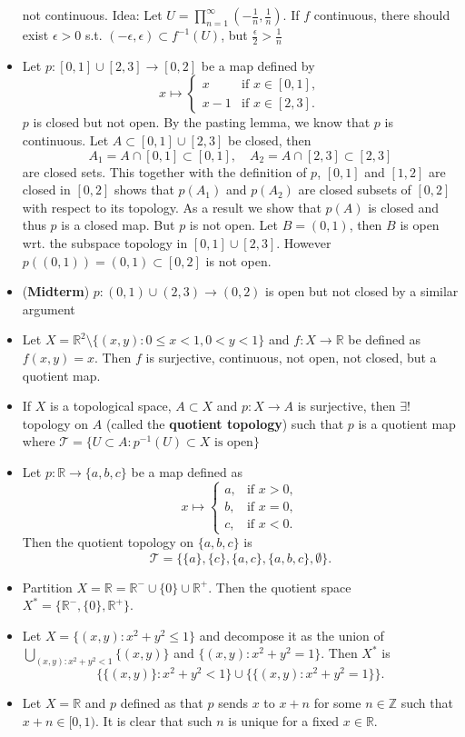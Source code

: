\documentclass[frenchspacing,9pt,landscape,a4paper]{article}
\newcommand{\BR}{\mathbb R}
\theoremstyle{remark}
\begin{document}
\begin{multicols}{4}
\begin{itemize}
        not continuous. Idea: Let  $U=\prod_{n=1}^\infty(-\frac{1}{n},\frac{1}{n})$. If $f$ continuous,
        there should exist  $\epsilon>0$ s.t.  $(-\epsilon,\epsilon)\subset f^{-1}(U)$, but
        $\frac{\epsilon}{2}>\frac{1}{n}$
    \item Let $p : [0,1] \cup [2,3] \to [0,2]$ be a map defined by
\[ x \mapsto \begin{cases}
x & \text{if } x \in [0,1], \\
x-1 & \text{if } x \in [2,3].
\end{cases} \]
$p$ is closed but not open. By the pasting lemma, we know that $p$ is continuous. Let $A \subset [0,1] \cup [2,3]$ be closed, then
\[ A_1 = A \cap [0,1] \subset [0,1], \quad A_2 = A \cap [2,3] \subset [2,3] \]
are closed sets. This together with the definition of $p$, $[0,1]$ and $[1,2]$ are closed in $[0,2]$ shows that $p(A_1)$ and $p(A_2)$ are closed subsets of $[0,2]$ with respect to its topology. As a result we show that $p(A)$ is closed and thus $p$ is a closed map. But $p$ is not open. Let $B = (0,1)$, then $B$ is open wrt. the subspace topology in $[0,1] \cup [2,3]$. However $p((0,1)) = (0,1) \subset [0,2]$ is not open.
\item (\textbf{Midterm}) $p:(0,1)\cup(2,3)\to(0,2)$ is open but not closed by a similar argument
\item Let $X=\BR^2\setminus\{(x,y):0\leq x<1,0<y<1\}$ and $f:X\to\BR$ be defined as  $f(x,y)=x$. Then  $f$
    is surjective, continuous, not open, not closed, but a quotient map.
\item If $X$ is a topological space,  $A\subset X$ and  $p:X\to A$ is surjective, then  $\exists!$ topology
    on  $A$ (called the \textbf{quotient topology}) such that  $p$ is a quotient map where
    $\mathcal{T}=\{U\subset A:p^{-1}(U)\subset X\text{ is open}\}$
\item Let $p : \mathbb{R} \to \{a, b, c\}$ be a map defined as
\[ x \mapsto \begin{cases}
a, & \text{if } x > 0, \\
b, & \text{if } x = 0, \\
c, & \text{if } x < 0.
\end{cases} \]
Then the quotient topology on $\{a, b, c\}$ is
\[ \mathcal{T} = \{\{a\}, \{c\}, \{a,c\}, \{a,b,c\}, \emptyset\}. \]
\item Partition $X = \mathbb{R} = \mathbb{R}^- \cup \{0\} \cup \mathbb{R}^+$. Then the quotient space $X^* = \{\mathbb{R}^-, \{0\}, \mathbb{R}^+\}$.
\item Let $X = \{(x,y) : x^2 + y^2 \leq 1\}$ and decompose it as the union of
    $\bigcup_{(x,y):x^2+y^2<1}\{(x,y)\}$ and $\{(x,y) : x^2 + y^2 = 1\}$. Then $X^*$ is
\[\{\{(x,y)\} : x^2 + y^2 < 1\} \cup \{\{(x,y) : x^2 + y^2 = 1\}\}. \]
\item Let $X = \mathbb{R}$ and $p$ defined as that $p$ sends $x$ to $x + n$ for some $n \in \mathbb{Z}$
    such that $x + n \in [0,1)$. It is clear that such $n$ is unique for a fixed $x \in \mathbb{R}$.


\end{itemize}
\end{multicols}
\end{document}
